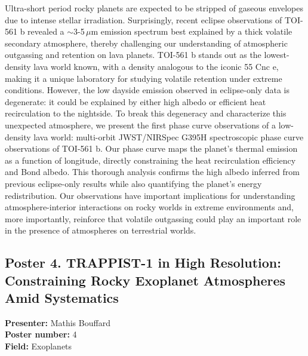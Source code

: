 Ultra-short period rocky planets are expected to be stripped of gaseous envelopes due to intense stellar irradiation. Surprisingly, recent eclipse observations of TOI-561 b revealed a $\sim$3-5\,$\mu$m emission spectrum best explained by a thick volatile secondary atmosphere, thereby challenging our understanding of atmospheric outgassing and retention on lava planets. TOI-561 b stands out as the lowest-density lava world known, with a density analogous to the iconic 55 Cnc e, making it a unique laboratory for studying volatile retention under extreme conditions. However, the low dayside emission observed in eclipse-only data is degenerate: it could be explained by either high albedo or efficient heat recirculation to the nightside. To break this degeneracy and characterize this unexpected atmosphere, we present the first phase curve observations of a low-density lava world: multi-orbit JWST/NIRSpec G395H spectroscopic phase curve observations of TOI-561 b. Our phase curve maps the planet's thermal emission as a function of longitude, directly constraining the heat recirculation efficiency and Bond albedo. This thorough analysis confirms the high albedo inferred from previous eclipse-only results while also quantifying the planet's energy redistribution. Our observations have important implications for understanding atmosphere-interior interactions on rocky worlds in extreme environments and, more importantly, reinforce that volatile outgassing could play an important role in the presence of atmospheres on terrestrial worlds.

\hypertarget{poster-abstract-talk-53}{}\label{poster-abstract-page-talk-53}
\subsection*{Poster 4. TRAPPIST-1 in High Resolution: Constraining Rocky Exoplanet Atmospheres Amid Systematics}
\textbf{Presenter:} Mathis Bouffard\\
\textbf{Poster number:} 4\\
\textbf{Field:} Exoplanets

